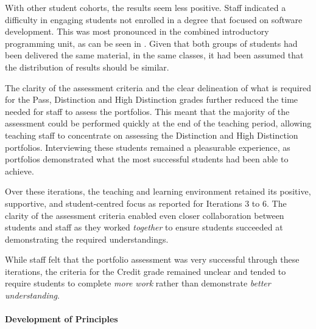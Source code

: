 With other student cohorts, the results seem less positive. Staff indicated a difficulty in engaging students not enrolled in a degree that focused on software development. This was most pronounced in the combined introductory programming unit, as can be seen in . Given that both groups of students had been delivered the same material, in the same classes, it had been assumed that the distribution of results should be similar. 



The clarity of the assessment criteria and the clear delineation of what is required for the Pass, Distinction and High Distinction grades further reduced the time needed for staff to assess the portfolios. This meant that the majority of the assessment could be performed quickly at the end of the teaching period, allowing teaching staff to concentrate on assessing the Distinction and High Distinction portfolios. Interviewing these students remained a pleasurable experience, as portfolios demonstrated what the most successful students had been able to achieve.

Over these iterations, the teaching and learning environment retained its positive, supportive, and student-centred focus as reported for Iterations 3 to 6. The clarity of the assessment criteria enabled even closer collaboration between students and staff as they worked \emph{together} to ensure students succeeded at demonstrating the required understandings.

While staff felt that the portfolio assessment was very successful through these iterations, the criteria for the Credit grade remained unclear and tended to require students to complete \emph{more work} rather than demonstrate \emph{better understanding}.

\paragraph{Development of Principles} %

